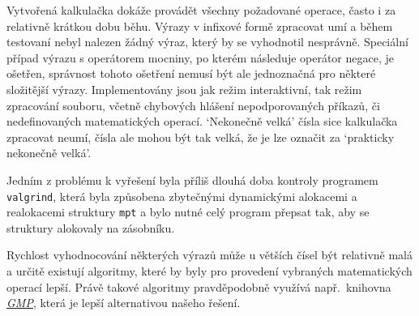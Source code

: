 Vytvořená kalkulačka dokáže provádět všechny požadované operace, často i za relativně krátkou dobu běhu. Výrazy v infixové formě zpracovat umí a během testovaní nebyl nalezen žádný výraz, který by se vyhodnotil nesprávně. Speciální případ výrazu s operátorem mocniny, po kterém následuje operátor negace, je ošetřen, správnost tohoto ošetření nemusí být ale jednoznačná pro některé složitější výrazy. Implementovány jsou jak režim interaktivní, tak režim zpracování souboru, včetně chybových hlášení nepodporovaných příkazů, či nedefinovaných matematických operací. `Nekonečně velká' čísla sice kalkulačka zpracovat neumí, čísla ale mohou být tak velká, že je lze označit za `prakticky nekonečně velká'.

Jedním z problému k vyřešení byla příliš dlouhá doba kontroly programem \verb|valgrind|, která byla  způsobena zbytečnými dynamickými alokacemi a realokacemi struktury \verb|mpt| a bylo nutné celý program přepsat tak, aby se struktury alokovaly na zásobníku. 

Rychlost vyhodnocování některých výrazů může u větších čísel být relativně malá a určitě existují algoritmy, které by byly pro provedení vybraných matematických operací lepší. Právě takové algoritmy pravděpodobně využívá např.~knihovna \href{https://gmplib.org/}{\textit{GMP}}, která je lepší alternativou našeho řešení.